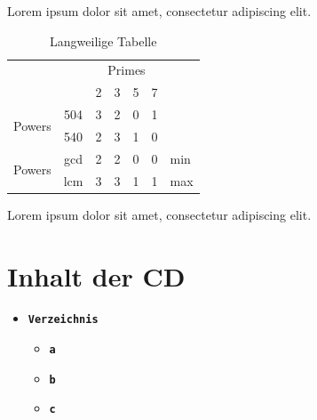 \documentclass[a4paper,10pt
headsepline,           %
doubleside,            %
pointlessnumbers,      %
bibtotoc,              %
BCOR15mm,               %
leqno					%
]{scrbook}
\begin{document}
Lorem ipsum dolor sit amet, consectetur adipiscing elit.

\begin{table}[th]
	\begin{center}
		\begin{tabular}{cc|c|c|c|c|l}
			\cline{3-6}
			&                           & \multicolumn{4}{c|}{Primes} \\
			\cline{3-6}
			&                           & 2 & 3 & 5 & 7       \\
			\cline{1-6}
			\multicolumn{1}{|c}{\multirow{2}{*}{Powers}} & \multicolumn{1}{|c|}{504} & 3 & 2 & 0 & 1 &     \\
			\cline{2-6}
			\multicolumn{1}{|c}{}                        & \multicolumn{1}{|c|}{540} & 2 & 3 & 1 & 0 &     \\
			\cline{1-6}
			\multicolumn{1}{|c}{\multirow{2}{*}{Powers}} & \multicolumn{1}{|c|}{gcd} & 2 & 2 & 0 & 0 & min \\
			\cline{2-6}
			\multicolumn{1}{|c}{}                        & \multicolumn{1}{|c|}{lcm} & 3 & 3 & 1 & 1 & max \\
			\cline{1-6}
		\end{tabular}
	\end{center}
	\caption{Langweilige Tabelle}
	\label{tbl:langweilig}
\end{table}

Lorem ipsum dolor sit amet, consectetur adipiscing elit.


\appendix

\chapter{Inhalt der CD}

\renewcommand{\labelitemi}{\tikz {\draw [line width=0.5pt] (0,0)--(0.25,0)--(0.25,0.15)--(0,0.15)--(0,0)--(0.25,0); \draw [line width=0.5pt] (0,0.15)--(0.05,0.2)--(0.15,0.2)--(0.2,0.15);}}
\renewcommand{\labelitemii}{\tikz {\draw [line width=0.5pt] (0,0)--(0.2,0)--(0.2,0.15)--(0.1,0.25)--(0,0.25)--(0,0)--(0.2,0); \draw [line width=0.5pt] (0.1,0.25)--(0.1,0.15)--(0.2,0.15);}}

\begin{itemize}
	\addtolength{\itemsep}{0.5\baselineskip}
	\item	\textbf{\texttt{Verzeichnis}}
	\begin{itemize}
		\addtolength{\itemsep}{-0.3\baselineskip}
		\item \textbf{\texttt{a}}
		\item \textbf{\texttt{b}}
		\item \textbf{\texttt{c}}
	\end{itemize}
\end{itemize}
\end{document}
